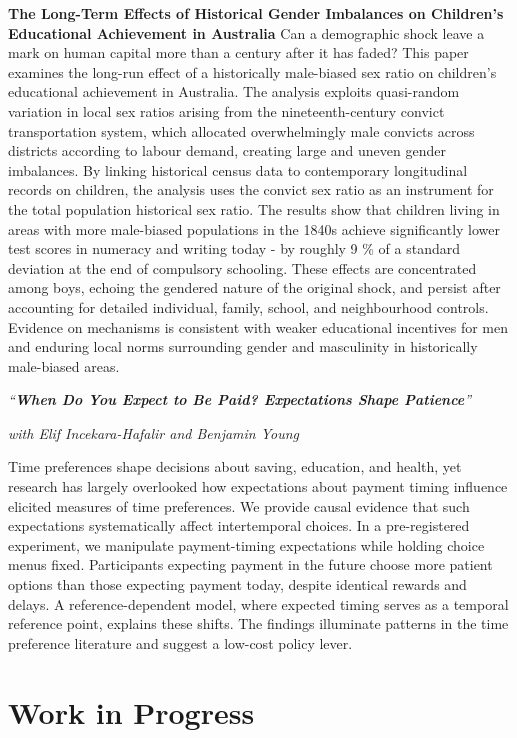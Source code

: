 \documentclass[11pt,a4paper]{article}
\newcommand{\nodate}[1]{#1\par\vspace{7pt}}
\newcommand{\paper}[3]{%
  \emph{``#1''}\par\vspace{1pt}
  \ifx\relax#2\relax\else{\small #2}\par\vspace{1pt}\fi
  {\small #3}\par}
\begin{document}
\nodate{\textbf{\paper
  {The Long-Term Effects of Historical Gender Imbalances on Children's Educational Achievement in Australia}}
  {\relax}
  {Can a demographic shock leave a mark on human capital more than a century after it has faded? This paper examines the long-run effect of a historically male-biased sex ratio on children's educational achievement in Australia. The analysis exploits quasi-random variation in local sex ratios arising from the nineteenth-century convict transportation system, which allocated overwhelmingly male convicts across districts according to labour demand, creating large and uneven gender imbalances. By linking historical census data to contemporary longitudinal records on children, the analysis uses the convict sex ratio as an instrument for the total population historical sex ratio. The results show that children living in areas with more male-biased populations in the 1840s achieve significantly lower test scores in numeracy and writing today - by roughly 9 \% of a standard deviation at the end of compulsory schooling. These effects are concentrated among boys, echoing the gendered nature of the original shock, and persist after accounting for detailed individual, family, school, and neighbourhood controls. Evidence on mechanisms is consistent with weaker educational incentives for men and enduring local norms surrounding gender and masculinity in historically male-biased areas.}}

\nodate{\paper
  {\textbf{When Do You Expect to Be Paid? Expectations Shape Patience}}
  {\textit{with Elif Incekara-Hafalir and Benjamin Young}}
   {\relax}
   {Time preferences shape decisions about saving, education, and health, yet research has largely overlooked how expectations about payment timing influence elicited measures of time preferences. We provide causal evidence that such expectations systematically affect intertemporal choices. In a pre-registered experiment, we manipulate payment-timing expectations while holding choice menus fixed. Participants expecting payment in the future choose more patient options than those expecting payment today, despite identical rewards and delays. A reference-dependent model, where expected timing serves as a temporal reference point, explains these shifts. The findings illuminate patterns in the time preference literature and suggest a low-cost policy lever.}}


\section{Work in Progress}
\end{document}

